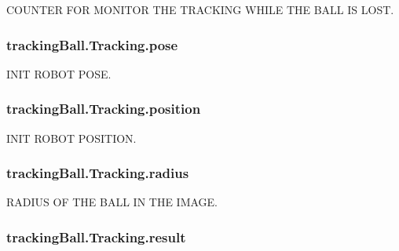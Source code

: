 C\+O\+U\+N\+T\+ER F\+OR M\+O\+N\+I\+T\+OR T\+HE T\+R\+A\+C\+K\+I\+NG W\+H\+I\+LE T\+HE B\+A\+LL IS L\+O\+ST. 

\subsubsection[{\texorpdfstring{pose}{pose}}]{\setlength{\rightskip}{0pt plus 5cm}tracking\+Ball.\+Tracking.\+pose}\hypertarget{classtrackingBall_1_1Tracking_af3d46e4a3b61c4cc2841cfdd6e02c459}{}\label{classtrackingBall_1_1Tracking_af3d46e4a3b61c4cc2841cfdd6e02c459}


I\+N\+IT R\+O\+B\+OT P\+O\+SE. 

\subsubsection[{\texorpdfstring{position}{position}}]{\setlength{\rightskip}{0pt plus 5cm}tracking\+Ball.\+Tracking.\+position}\hypertarget{classtrackingBall_1_1Tracking_a8698f440e6e3e4b1b785cab162794b61}{}\label{classtrackingBall_1_1Tracking_a8698f440e6e3e4b1b785cab162794b61}


I\+N\+IT R\+O\+B\+OT P\+O\+S\+I\+T\+I\+ON. 

\subsubsection[{\texorpdfstring{radius}{radius}}]{\setlength{\rightskip}{0pt plus 5cm}tracking\+Ball.\+Tracking.\+radius}\hypertarget{classtrackingBall_1_1Tracking_a9216a69022a6756b653d59834bb46de3}{}\label{classtrackingBall_1_1Tracking_a9216a69022a6756b653d59834bb46de3}


R\+A\+D\+I\+US OF T\+HE B\+A\+LL IN T\+HE I\+M\+A\+GE. 

\subsubsection[{\texorpdfstring{result}{result}}]{\setlength{\rightskip}{0pt plus 5cm}tracking\+Ball.\+Tracking.\+result}\hypertarget{classtrackingBall_1_1Tracking_abe3eb1a78c5f9464274125a664c694b9}{}\label{classtrackingBall_1_1Tracking_abe3eb1a78c5f9464274125a664c694b9}
